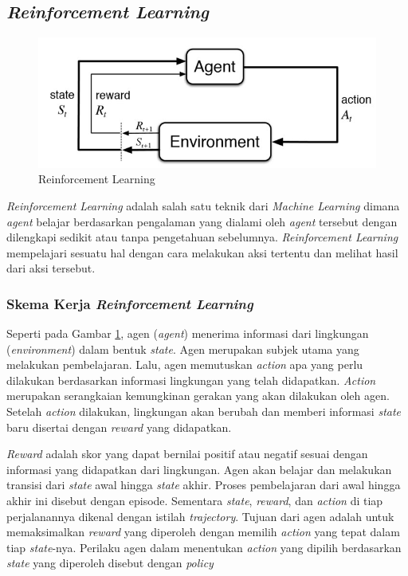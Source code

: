\subsection{\textit{Reinforcement Learning}}
\begin{figure}[H] 
	\centering
	\includegraphics[width=.4\linewidth]{images/reinforcement_learning}
	\caption{Reinforcement Learning}
	\label{fig:reinforcement_learning}
\end{figure}
\textit{Reinforcement Learning }adalah salah satu teknik dari \textit{Machine Learning }dimana \textit{agent }belajar berdasarkan pengalaman yang dialami oleh \textit{agent }tersebut dengan dilengkapi sedikit atau tanpa pengetahuan sebelumnya. \textit{Reinforcement Learning }mempelajari sesuatu hal dengan cara melakukan aksi tertentu dan melihat hasil dari aksi tersebut.\cite{cit:rl_book}

\subsubsection{Skema Kerja \textit{Reinforcement Learning}}
Seperti pada Gambar \ref{fig:reinforcement_learning}, agen (\textit{agent}) menerima informasi dari lingkungan (\textit{environment}) dalam bentuk \textit{state}. Agen merupakan subjek utama yang melakukan pembelajaran. Lalu, agen memutuskan \textit{action }apa yang perlu dilakukan berdasarkan informasi lingkungan yang telah didapatkan. \textit{Action }merupakan serangkaian kemungkinan gerakan yang akan dilakukan oleh agen. Setelah \textit{action }dilakukan, lingkungan akan berubah dan memberi informasi \textit{state }baru disertai dengan \textit{reward }yang didapatkan.

\textit{Reward }adalah skor yang dapat bernilai positif atau negatif sesuai dengan informasi yang didapatkan dari lingkungan. Agen akan belajar dan melakukan transisi dari \textit{state }awal hingga \textit{state }akhir. Proses pembelajaran dari awal hingga akhir ini disebut dengan episode. Sementara \textit{state}, \textit{reward}, dan \textit{action }di tiap perjalanannya dikenal dengan istilah \textit{trajectory}. Tujuan dari agen adalah untuk memaksimalkan \textit{reward }yang diperoleh dengan memilih \textit{action }yang tepat dalam tiap \textit{state}-nya. Perilaku agen dalam menentukan \textit{action }yang dipilih berdasarkan \textit{state }yang diperoleh disebut dengan \textit{policy}

